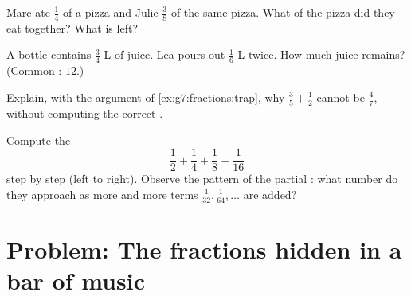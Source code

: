 \begin{exercise}[$\star\star$]\label{exo:g7:fractions:9}
Marc ate $\frac14$ of a pizza and Julie $\frac38$ of the same pizza.
What  of the pizza did they eat together? What  is
left?
\end{exercise}

\begin{exercise}[$\star\star$]\label{exo:g7:fractions:10}
A bottle contains $\frac34$ L of juice. Lea pours out $\frac16$ L
twice. How much juice remains? (Common : $12$.)
\end{exercise}

\begin{exercise}[$\star\star$]\label{exo:g7:fractions:11}
Explain, with the argument of \cref{ex:g7:fractions:trap}, why
$\frac35 + \frac12$ cannot be $\frac{4}{7}$, without computing the
correct .
\end{exercise}

\begin{exercise}[$\star\star\star$]\label{exo:g7:fractions:12}
Compute the 
\[
\frac12 + \frac14 + \frac18 + \frac{1}{16}
\]
step by step (left to right). Observe the pattern of the partial :
what number do they approach as more and more terms
$\frac{1}{32}, \frac{1}{64}, \dots$ are added?
\end{exercise}

\section{Problem: The fractions hidden in a bar of music}

